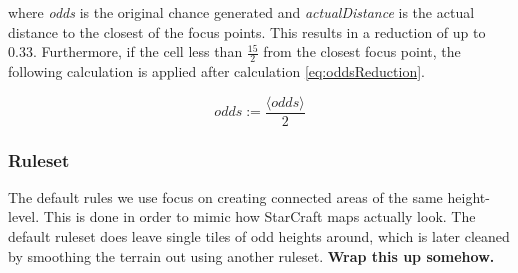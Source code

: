 where \textit{odds} is the original chance generated and \textit{actualDistance} is the actual distance to the closest of the focus points. This results in a reduction of up to 0.33. Furthermore, if the cell less than $\frac{15}{2}$ from the closest focus point, the following calculation is applied after calculation \ref{eq:oddsReduction}.

\begin{equation}
	odds := \frac{\langle odds\rangle}{2}
\end{equation}

\subsubsection{Ruleset}

The default rules we use focus on creating connected areas of the same height-level. This is done in order to mimic how StarCraft maps actually look. The default ruleset does leave single tiles of odd heights around, which is later cleaned by smoothing the terrain out using another ruleset. \textbf{Wrap this up somehow.}